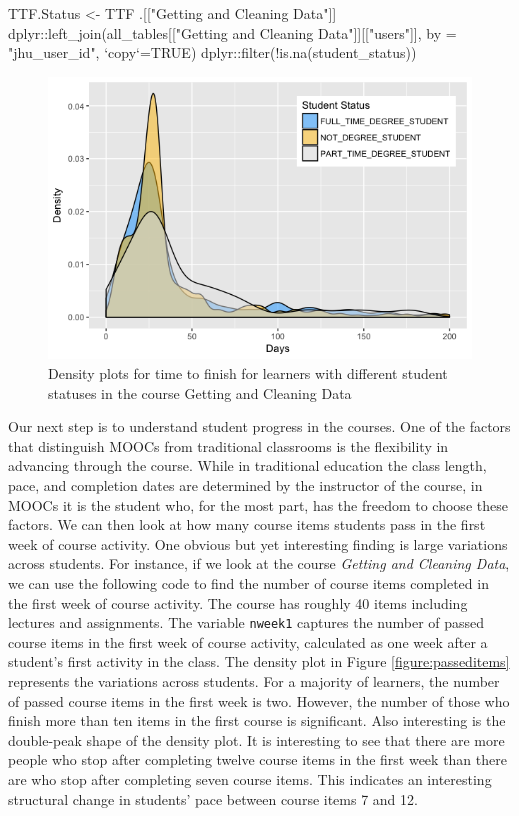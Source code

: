 \begin{Schunk}
\begin{Sinput}
TTF.Status <- TTF %
    .[["Getting and Cleaning Data"]] %
    dplyr::left_join(all_tables[["Getting and Cleaning Data"]][["users"]], 
                     by = "jhu_user_id", `copy`=TRUE) %
    dplyr::filter(!is.na(student_status))
\end{Sinput}
\end{Schunk}

\begin{figure}[htbp]
    \centering
    \includegraphics[scale=0.5]{stustatus}
    \caption{Density plots for time to finish for learners with different student statuses in the course Getting and Cleaning Data}
    \label{figure:stustatus}
\end{figure}

Our next step is to understand student progress in the courses. One of
the factors that distinguish MOOCs from traditional classrooms is the
flexibility in advancing through the course. While in traditional
education the class length, pace, and completion dates are determined by
the instructor of the course, in MOOCs it is the student who, for the
most part, has the freedom to choose these factors. We can then look at
how many course items students pass in the first week of course
activity. One obvious but yet interesting finding is large variations
across students. For instance, if we look at the course \emph{Getting
and Cleaning Data}, we can use the following code to find the number of
course items completed in the first week of course activity. The course
has roughly 40 items including lectures and assignments. The variable
\texttt{nweek1} captures the number of passed course items in the first
week of course activity, calculated as one week after a student's first
activity in the class. The density plot in Figure
\ref{figure:passeditems} represents the variations across students. For
a majority of learners, the number of passed course items in the first
week is two. However, the number of those who finish more than ten items
in the first course is significant. Also interesting is the double-peak
shape of the density plot. It is interesting to see that there are more
people who stop after completing twelve course items in the first week
than there are who stop after completing seven course items. This
indicates an interesting structural change in students' pace between
course items 7 and 12.

